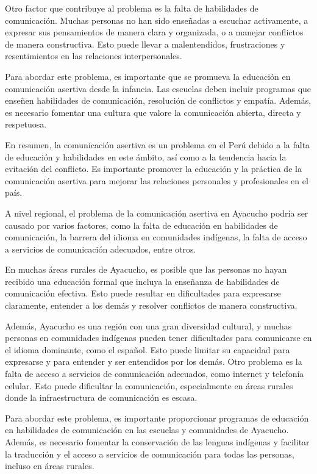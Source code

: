 \documentclass[12pt,a4paper]{article}
\begin{document}
Otro factor que contribuye al problema es la falta de habilidades de comunicación. Muchas personas no han sido enseñadas a escuchar activamente, a expresar sus pensamientos de manera clara y organizada, o a manejar conflictos de manera constructiva. Esto puede llevar a malentendidos, frustraciones y resentimientos en las relaciones interpersonales.

Para abordar este problema, es importante que se promueva la educación en comunicación asertiva desde la infancia. Las escuelas deben incluir programas que enseñen habilidades de comunicación, resolución de conflictos y empatía. Además, es necesario fomentar una cultura que valore la comunicación abierta, directa y respetuosa.

En resumen, la comunicación asertiva es un problema en el Perú debido a la falta de educación y habilidades en este ámbito, así como a la tendencia hacia la evitación del conflicto. Es importante promover la educación y la práctica de la comunicación asertiva para mejorar las relaciones personales y profesionales en el país.

A nivel regional, el problema de la comunicación asertiva en Ayacucho podría ser causado por varios factores, como la falta de educación en habilidades de comunicación, la barrera del idioma en comunidades indígenas, la falta de acceso a servicios de comunicación adecuados, entre otros.

En muchas áreas rurales de Ayacucho, es posible que las personas no hayan recibido una educación formal que incluya la enseñanza de habilidades de comunicación efectiva. Esto puede resultar en dificultades para expresarse claramente, entender a los demás y resolver conflictos de manera constructiva.

Además, Ayacucho es una región con una gran diversidad cultural, y muchas personas en comunidades indígenas pueden tener dificultades para comunicarse en el idioma dominante, como el español. Esto puede limitar su capacidad para expresarse y para entender y ser entendidos por los demás.
Otro problema es la falta de acceso a servicios de comunicación adecuados, como internet y telefonía celular. Esto puede dificultar la comunicación, especialmente en áreas rurales donde la infraestructura de comunicación es escasa.

Para abordar este problema, es importante proporcionar programas de educación en habilidades de comunicación en las escuelas y comunidades de Ayacucho. Además, es necesario fomentar la conservación de las lenguas indígenas y facilitar la traducción y el acceso a servicios de comunicación para todas las personas, incluso en áreas rurales\cite{gray_caricaturas_2015}.
\end{document}
